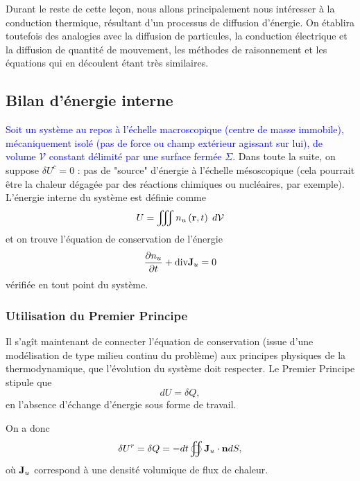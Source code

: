 \documentclass[11pt,a4paper]{report}
\begin{document}
Durant le reste de cette leçon, nous allons principalement nous intéresser à la conduction thermique, résultant d'un processus de diffusion d'énergie. On établira toutefois des analogies avec la diffusion de particules, la conduction électrique et la diffusion de quantité de mouvement, les méthodes de raisonnement et les équations qui en découlent étant très similaires.

\newpage
\subsection{Bilan d'énergie interne}

\textcolor{blue}{Soit un système au repos à l'échelle macroscopique (centre de masse immobile), mécaniquement isolé (pas de force ou champ extérieur agissant sur lui), de volume $\mathcal{V}$ constant délimité par une surface fermée $\Sigma$.} Dans toute la suite, on suppose $\delta U^c = 0$ : pas de "source" d'énergie à l'échelle mésoscopique (cela pourrait être la chaleur dégagée par des réactions chimiques ou nucléaires, par exemple). L'énergie interne du système est définie comme
\begin{equation}
	U = \iiint n_u\left(\bold{r},t\right)\;d\mathcal{V}
\end{equation}
et on trouve l'équation de conservation de l'énergie
\begin{equation}
	\displaystyle{\frac{\partial n_u}{\partial t} + \text{div}\bold{J}_u = 0}
	\label{eq:energy_conservation_local}
\end{equation}
vérifiée en tout point du système.

\subsubsection{Utilisation du Premier Principe}

Il s'agît maintenant de connecter l'équation de conservation (issue d'une modélisation de type milieu continu du problème) aux principes physiques de la thermodynamique, que l'évolution du système doit respecter. Le Premier Principe stipule que
\begin{equation}
	dU = \delta Q,
\end{equation}
en l'absence d'échange d'énergie sous forme de travail.

On a donc
\begin{equation}
	\delta U^r = \delta Q = - dt\oiint \bold{J}_u\cdot\bold{n}dS,
\end{equation}
où $\bold{J}_u$ correspond à une densité volumique de flux de chaleur.
\end{document}
